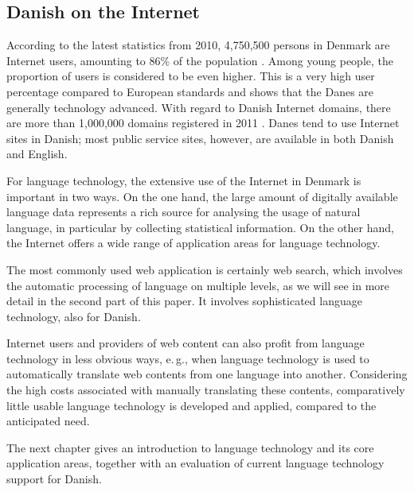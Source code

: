 \begin{multicols}{2}

\subsection{Danish on the Internet}

 According to the latest statistics from 2010, 4,750,500 persons in Denmark are Internet users, amounting to 86\% of the population \cite{worldstats}.  Among young people, the proportion of users is considered to be even higher. This is a very high user percentage compared to European standards and shows that the Danes are generally technology advanced. With regard to Danish Internet domains, there are more than 1,000,000 domains registered in 2011 \cite{hostmaster}. Danes tend to use Internet sites in Danish; most public service sites, however, are available in both Danish and English.

 
For language technology, the extensive use of the Internet in Denmark is important in two ways. On the one hand, the large amount of digitally available language data represents a rich source for analysing the usage of natural language, in particular by collecting statistical information. On the other hand, the Internet offers a wide range of application areas for language technology. 

The most commonly used web application is certainly web search, which involves the automatic processing of language on multiple levels, as we will see in more detail in the second part of this paper. It involves sophisticated language technology, also for Danish.  

Internet users and providers of web content can also profit from language technology in less obvious ways, e.\,g., when language technology is used to automatically translate web contents from one language into another. Considering the high costs associated with manually translating these contents, comparatively little usable language technology is developed and applied, compared to the anticipated need.

The next chapter gives an introduction to language technology and its core application areas, together with an evaluation of current language technology support for Danish.
\end{multicols}


